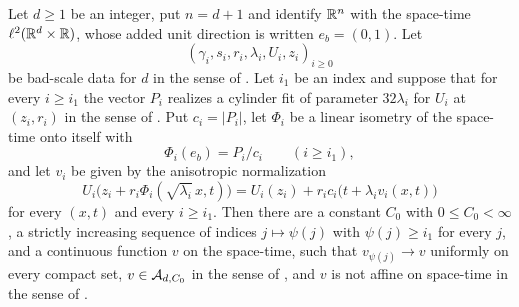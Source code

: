 \begin{theorem}
Let $d\ge1$ be an integer, put $n=d+1$ and identify $\mathbb{R}^n$ with the space-time
$\ell^2(\mathbb{R}^d\times\mathbb{R})$, whose added unit direction is written $e_b=(0,1)$. Let
\[
  (\gamma_i,s_i,r_i,\lambda_i,U_i,z_i)_{i\ge0}
\]
be bad-scale data for $d$ in the sense of . Let $i_1$ be
an index and suppose that for every $i\ge i_1$ the vector $P_i$ realizes a
cylinder fit of parameter $32\lambda_i$ for $U_i$ at $(z_i,r_i)$ in the sense of
. Put $c_i=|P_i|$, let $\Phi_i$ be a linear isometry of
the space-time onto itself with
\[
  \Phi_i(e_b)=P_i/c_i\qquad(i\ge i_1),
\]
and let $v_i$ be given by the anisotropic normalization
\begin{equation}\label{eq:nl-normalization}
  U_i\bigl(z_i+r_i\Phi_i(\sqrt{\lambda_i}\,x,t)\bigr)
     =U_i(z_i)+r_ic_i\bigl(t+\lambda_iv_i(x,t)\bigr)
\end{equation}
for every $(x,t)$ and every $i\ge i_1$. Then there are a constant
$C_0$ with $0\le C_0<\infty$, a strictly increasing sequence of indices
$j\mapsto\psi(j)$ with $\psi(j)\ge i_1$ for every $j$, and a continuous function
$v$ on the space-time, such that $v_{\psi(j)}\to v$ uniformly on every compact
set, $v\in\mathcal{A}_{d,C_0}$ in the sense of , and $v$ is not
affine on space-time in the sense of .
\end{theorem}
